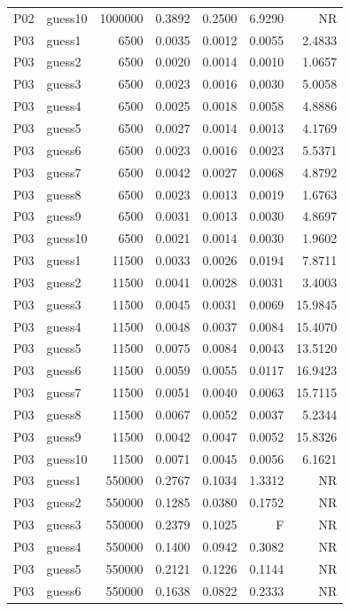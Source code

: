 {\begin{longtable}{llrrrrr}
P02 & guess10 & 1000000 & 0.3892 & 0.2500 & 6.9290 & NR \\
P03 & guess1 & 6500 & 0.0035 & 0.0012 & 0.0055 & 2.4833 \\
P03 & guess2 & 6500 & 0.0020 & 0.0014 & 0.0010 & 1.0657 \\
P03 & guess3 & 6500 & 0.0023 & 0.0016 & 0.0030 & 5.0058 \\
P03 & guess4 & 6500 & 0.0025 & 0.0018 & 0.0058 & 4.8886 \\
P03 & guess5 & 6500 & 0.0027 & 0.0014 & 0.0013 & 4.1769 \\
P03 & guess6 & 6500 & 0.0023 & 0.0016 & 0.0023 & 5.5371 \\
P03 & guess7 & 6500 & 0.0042 & 0.0027 & 0.0068 & 4.8792 \\
P03 & guess8 & 6500 & 0.0023 & 0.0013 & 0.0019 & 1.6763 \\
P03 & guess9 & 6500 & 0.0031 & 0.0013 & 0.0030 & 4.8697 \\
P03 & guess10 & 6500 & 0.0021 & 0.0014 & 0.0030 & 1.9602 \\
P03 & guess1 & 11500 & 0.0033 & 0.0026 & 0.0194 & 7.8711 \\
P03 & guess2 & 11500 & 0.0041 & 0.0028 & 0.0031 & 3.4003 \\
P03 & guess3 & 11500 & 0.0045 & 0.0031 & 0.0069 & 15.9845 \\
P03 & guess4 & 11500 & 0.0048 & 0.0037 & 0.0084 & 15.4070 \\
P03 & guess5 & 11500 & 0.0075 & 0.0084 & 0.0043 & 13.5120 \\
P03 & guess6 & 11500 & 0.0059 & 0.0055 & 0.0117 & 16.9423 \\
P03 & guess7 & 11500 & 0.0051 & 0.0040 & 0.0063 & 15.7115 \\
P03 & guess8 & 11500 & 0.0067 & 0.0052 & 0.0037 & 5.2344 \\
P03 & guess9 & 11500 & 0.0042 & 0.0047 & 0.0052 & 15.8326 \\
P03 & guess10 & 11500 & 0.0071 & 0.0045 & 0.0056 & 6.1621 \\
P03 & guess1 & 550000 & 0.2767 & 0.1034 & 1.3312 & NR \\
P03 & guess2 & 550000 & 0.1285 & 0.0380 & 0.1752 & NR \\
P03 & guess3 & 550000 & 0.2379 & 0.1025 & F & NR \\
P03 & guess4 & 550000 & 0.1400 & 0.0942 & 0.3082 & NR \\
P03 & guess5 & 550000 & 0.2121 & 0.1226 & 0.1144 & NR \\
P03 & guess6 & 550000 & 0.1638 & 0.0822 & 0.2333 & NR \\

\end{longtable}}
